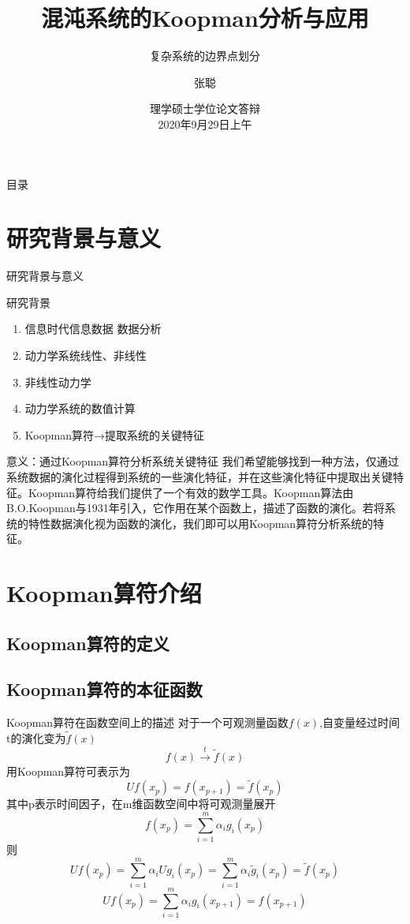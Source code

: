 \documentclass{beamer}
\title[混沌系统的Koopman分析与应用]{\LARGE 混沌系统的Koopman分析与应用}
\subtitle{复杂系统的边界点划分}
\author{张聪}
\institute[北京邮电大学理学院(系统科学)]{指导教师：兰岳恒\\北京邮电大学理学院}
\date[理学硕士学位论文答辩]{理学硕士学位论文答辩\\2020年9月29日上午}
\begin{document}
\kaishu

\begin{frame}
\titlepage
\end{frame}

\begin{frame}{目录}
\tableofcontents%
\end{frame}

\section{研究背景与意义}
		\begin{frame}{研究背景与意义}
		\begin{block}{研究背景}
		\begin{enumerate}
			\item 信息时代\textrightarrow 信息\textrightarrow 数据 \textrightarrow 数据分析
			\item 动力学系统\textrightarrow 线性、非线性
			\item 非线性动力学
			\item 动力学系统的数值计算
			\item Koopman算符→提取系统的关键特征
		\end{enumerate}
		\end{block}
		\begin{block}{意义：通过Koopman算符分析系统关键特征}
\indent 我们希望能够找到一种方法，仅通过系统数据的演化过程得到系统的一些演化特征，并在这些演化特征中提取出关键特征。Koopman算符给我们提供了一个有效的数学工具。Koopman算法由B.O.Koopman与1931年引入，它作用在某个函数上，描述了函数的演化。若将系统的特性数据演化视为函数的演化，我们即可以用Koopman算符分析系统的特征。
		\end{block}
		\end{frame}
		
\section{Koopman算符介绍}
	\subsection{Koopman算符的定义}

	\subsection{Koopman算符的本征函数}
	\begin{frame}{Koopman算符在函数空间上的描述}
	对于一个可观测量函数$f(x)$,自变量经过时间t的演化变为$\tilde{f}(x)$
	$$f(x)\xrightarrow{t}\tilde{f}(x)$$
	用Koopman算符可表示为
	$$Uf(x_p)=f(x_{p+1})=\tilde{f}(x_p)$$
	其中p表示时间因子，在m维函数空间中将可观测量展开
	$$f(x_p)=\sum_{i=1}^{m}\alpha_ig_i(x_p)$$
	则
	$$Uf(x_p)=\sum_{i=1}^{m}\alpha_iUg_i(x_p)=\sum_{i=1}^{m}\alpha_i\tilde{g}_i(x_p)=\tilde{f}(x_p)$$
	$$Uf(x_p)=\sum_{i=1}^{m}\alpha_ig_i(x_{p+1})=f(x_{p+1})$$
	\end{frame}
	
\end{document}
